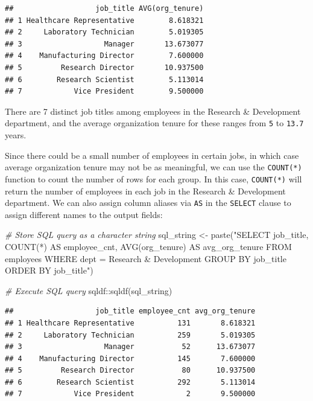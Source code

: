 \documentclass[
]{book}
\newenvironment{Shaded}{\begin{snugshade}}{\end{snugshade}}
\newcommand{\CommentTok}[1]{\textcolor[rgb]{0.56,0.35,0.01}{\textit{#1}}}
\newcommand{\FunctionTok}[1]{\textcolor[rgb]{0.00,0.00,0.00}{#1}}
\newcommand{\NormalTok}[1]{#1}
\newcommand{\OtherTok}[1]{\textcolor[rgb]{0.56,0.35,0.01}{#1}}
\newcommand{\SpecialCharTok}[1]{\textcolor[rgb]{0.00,0.00,0.00}{#1}}
\newcommand{\StringTok}[1]{\textcolor[rgb]{0.31,0.60,0.02}{#1}}
\begin{document}
\begin{verbatim}
##                   job_title AVG(org_tenure)
## 1 Healthcare Representative        8.618321
## 2     Laboratory Technician        5.019305
## 3                   Manager       13.673077
## 4    Manufacturing Director        7.600000
## 5         Research Director       10.937500
## 6        Research Scientist        5.113014
## 7            Vice President        9.500000
\end{verbatim}

There are 7 distinct job titles among employees in the Research \& Development department, and the average organization tenure for these ranges from \texttt{5} to \texttt{13.7} years.

Since there could be a small number of employees in certain jobs, in which case average organization tenure may not be as meaningful, we can use the \texttt{COUNT(*)} function to count the number of rows for each group. In this case, \texttt{COUNT(*)} will return the number of employees in each job in the Research \& Development department. We can also assign column aliases via \texttt{AS} in the \texttt{SELECT} clause to assign different names to the output fields:

\begin{Shaded}
\begin{Highlighting}[]
\CommentTok{\# Store SQL query as a character string}
\NormalTok{sql\_string }\OtherTok{\textless{}{-}} \FunctionTok{paste}\NormalTok{(}\StringTok{"SELECT}
\StringTok{                      job\_title,}
\StringTok{                      COUNT(*) AS employee\_cnt,}
\StringTok{                      AVG(org\_tenure) AS avg\_org\_tenure}
\StringTok{                    FROM}
\StringTok{                      employees}
\StringTok{                    WHERE}
\StringTok{                      dept = \textquotesingle{}Research \& Development\textquotesingle{}}
\StringTok{                    GROUP BY}
\StringTok{                      job\_title}
\StringTok{                    ORDER BY}
\StringTok{                      job\_title"}\NormalTok{)}

\CommentTok{\# Execute SQL query}
\NormalTok{sqldf}\SpecialCharTok{::}\FunctionTok{sqldf}\NormalTok{(sql\_string)}
\end{Highlighting}
\end{Shaded}

\begin{verbatim}
##                   job_title employee_cnt avg_org_tenure
## 1 Healthcare Representative          131       8.618321
## 2     Laboratory Technician          259       5.019305
## 3                   Manager           52      13.673077
## 4    Manufacturing Director          145       7.600000
## 5         Research Director           80      10.937500
## 6        Research Scientist          292       5.113014
## 7            Vice President            2       9.500000
\end{verbatim}
\end{document}
